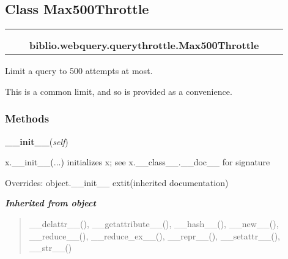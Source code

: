 \subsection{Class Max500Throttle}

    \label{biblio:webquery:querythrottle:Max500Throttle}
\begin{tabular}{cccccc}
\multicolumn{2}{r}{\settowidth{\BCL}{object}\multirow{2}{\BCL}{object}}
&&
  \\\cline{3-3}
  &&\multicolumn{1}{c|}{}
&&
  \\
&&\multicolumn{2}{l}{\textbf{biblio.webquery.querythrottle.Max500Throttle}}
\end{tabular}


Limit a query to 500 attempts at most.

This is a common limit, and so is provided as a convenience.


  \subsubsection{Methods}

    \vspace{0.5ex}

\hspace{.8\funcindent}\begin{boxedminipage}{\funcwidth}

    \raggedright \textbf{\_\_init\_\_}(\textit{self})

\setlength{\parskip}{2ex}
    x.\_\_init\_\_(...) initializes x; see x.\_\_class\_\_.\_\_doc\_\_ for 
    signature

\setlength{\parskip}{1ex}
      Overrides: object.\_\_init\_\_ 	extit{(inherited documentation)}

    \end{boxedminipage}


\large{\textbf{\textit{Inherited from object}}}

\begin{quote}
\_\_delattr\_\_(), \_\_getattribute\_\_(), \_\_hash\_\_(), \_\_new\_\_(), \_\_reduce\_\_(), \_\_reduce\_ex\_\_(), \_\_repr\_\_(), \_\_setattr\_\_(), \_\_str\_\_()
\end{quote}

